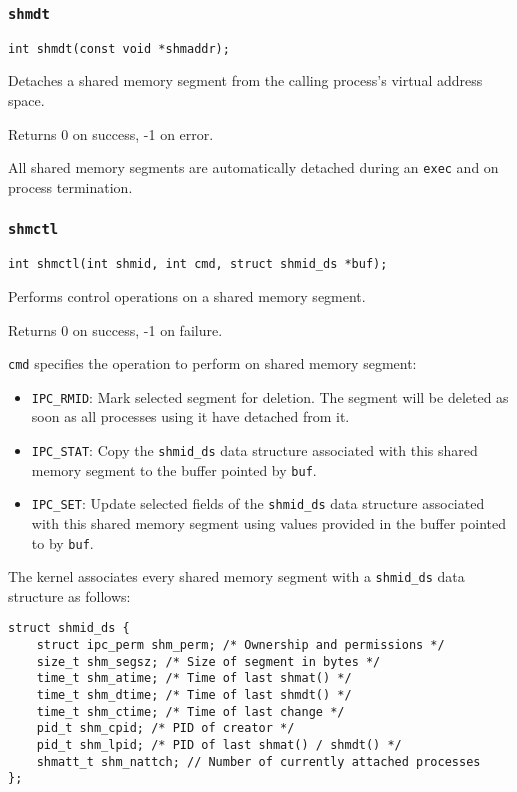 \documentclass{article}
\begin{document}
\subsubsection{\texttt{shmdt}}

\begin{verbatim}
int shmdt(const void *shmaddr);
\end{verbatim}

Detaches a shared memory segment from the calling process's virtual address space.

Returns 0 on success, -1 on error.

All shared memory segments are automatically detached during an \texttt{exec} and on process termination.


\subsubsection{\texttt{shmctl}}

\begin{verbatim}
int shmctl(int shmid, int cmd, struct shmid_ds *buf);
\end{verbatim}

Performs control operations on a shared memory segment.

Returns 0 on success, -1 on failure.

\texttt{cmd} specifies the operation to perform on shared memory segment:

\begin{itemize}
    \item \texttt{IPC\_RMID}: Mark selected segment for deletion. The segment will be deleted as soon as all processes using it have detached from it.
    \item \texttt{IPC\_STAT}: Copy the \texttt{shmid\_ds} data structure associated with this shared memory segment to the buffer pointed by \texttt{buf}.
    \item \texttt{IPC\_SET}: Update selected fields of the \texttt{shmid\_ds} data structure associated with this shared memory segment using values provided in the buffer pointed to by \texttt{buf}.
\end{itemize}

The kernel associates every shared memory segment with a \texttt{shmid\_ds} data structure as follows:

\begin{verbatim}
struct shmid_ds {
    struct ipc_perm shm_perm; /* Ownership and permissions */
    size_t shm_segsz; /* Size of segment in bytes */
    time_t shm_atime; /* Time of last shmat() */
    time_t shm_dtime; /* Time of last shmdt() */
    time_t shm_ctime; /* Time of last change */
    pid_t shm_cpid; /* PID of creator */
    pid_t shm_lpid; /* PID of last shmat() / shmdt() */
    shmatt_t shm_nattch; // Number of currently attached processes
};
\end{verbatim}
\end{document}
